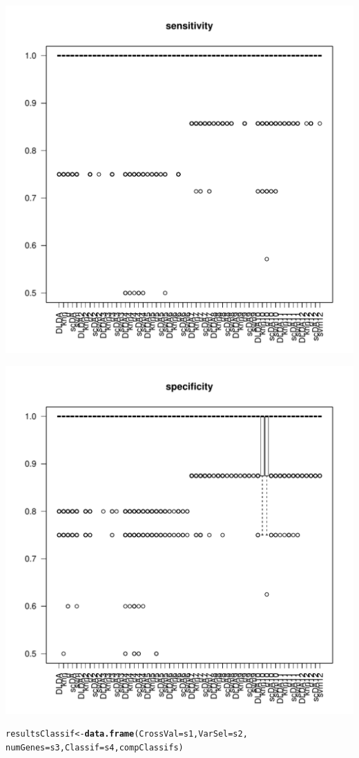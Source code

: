 \documentclass{article}\usepackage[]{graphicx}\usepackage[]{color}
\makeatletter
\def\maxwidth{ %
  \ifdim\Gin@nat@width>\linewidth
    \linewidth
  \else
    \Gin@nat@width
  \fi
}
\newcommand{\hlstd}[1]{\textcolor[rgb]{0.345,0.345,0.345}{#1}}%
\newcommand{\hlkwb}[1]{\textcolor[rgb]{0.69,0.353,0.396}{#1}}%
\newcommand{\hlkwc}[1]{\textcolor[rgb]{0.333,0.667,0.333}{#1}}%
\newcommand{\hlkwd}[1]{\textcolor[rgb]{0.737,0.353,0.396}{\textbf{#1}}}%
\newenvironment{kframe}{%
 \def\at@end@of@kframe{}%
 \ifinner\ifhmode%
  \def\at@end@of@kframe{\end{minipage}}%
  \begin{minipage}{\columnwidth}%
 \fi\fi%
 \def\FrameCommand##1{\hskip\@totalleftmargin \hskip-\fboxsep
 \colorbox{shadecolor}{##1}\hskip-\fboxsep
     \hskip-\linewidth \hskip-\@totalleftmargin \hskip\columnwidth}%
 \MakeFramed {\advance\hsize-\width
   \@totalleftmargin\z@ \linewidth\hsize
   \@setminipage}}%
 {\par\unskip\endMakeFramed%
 \at@end@of@kframe}
\newenvironment{knitrout}{}{} %
\makeatother
\begin{document}
\begin{knitrout}
\includegraphics[width=\maxwidth]{images/graficclassify1Eval-2} 

\includegraphics[width=\maxwidth]{images/graficclassify1Eval-3} 
\begin{kframe}\begin{alltt}
\hlstd{resultsClassif} \hlkwb{<-} \hlkwd{data.frame}\hlstd{(}\hlkwc{CrossVal}\hlstd{=s1,} \hlkwc{VarSel}\hlstd{=s2,}
                             \hlkwc{numGenes}\hlstd{=s3,} \hlkwc{Classif}\hlstd{=s4,compClassifs)}
\end{alltt}



\end{kframe}
\end{knitrout}
\end{document}
